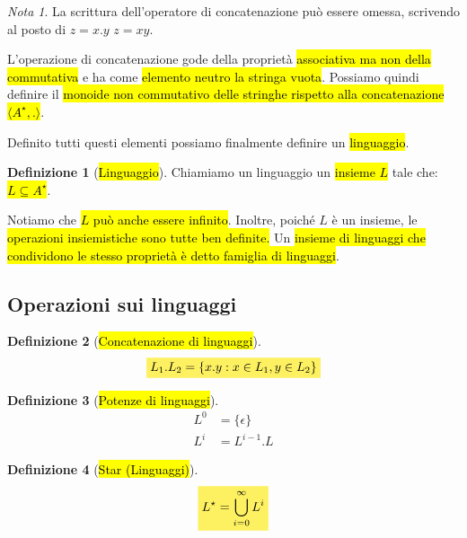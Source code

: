 \documentclass[a4paper,11pt,twoside]{article}
\theoremstyle{plain}
\theoremstyle{definition}
\newtheorem{defn}{Definizione}[section]
\theoremstyle{remark}
\newtheorem*{nota}{Nota}
\newcommand{\mhl}[1]{\colorbox{hlcolor}{$\displaystyle #1$}}
\begin{document}
\begin{nota}
  La scrittura dell'operatore di concatenazione può essere omessa, scrivendo al
  posto di $z = x.y$ $z = xy$.
\end{nota}

L'operazione di concatenazione gode della proprietà \hl{associativa ma non della
commutativa} e ha come \hl{elemento neutro la stringa vuota}. Possiamo quindi
definire il \hl{monoide non commutativo delle stringhe rispetto alla
concatenazione $\langle A^\star, . \rangle$}.

Definito tutti questi elementi possiamo finalmente definire un \hl{linguaggio}.

\begin{defn}[\hl{Linguaggio}]\label{def:linguaggio}
  Chiamiamo un linguaggio un \hl{insieme $L$} tale che:
  \hl{$L \subseteq A^\star$}.
\end{defn}

Notiamo che \hl{$L$ può anche essere infinito}. Inoltre, poiché $L$ è un
insieme, le \hl{operazioni insiemistiche sono tutte ben definite.} Un
\hl{insieme di linguaggi che condividono le stesso proprietà è detto famiglia di
linguaggi}.

\subsection{Operazioni sui linguaggi}

\begin{defn}[\hl{Concatenazione di linguaggi}]\label{def:concatenazione-ling}
  \begin{equation}
    \mhl{ L_1 . L_2 = \{ x.y : x \in L_1, y \in L_2 \} }
  \end{equation}
\end{defn}

\begin{defn}[\hl{Potenze di linguaggi}]\label{def:potenze-linguaggi}
  \begin{equation}
    \begin{aligned}
      L^0 & = \{\epsilon\} \\
      L^i & = L^{i-1}.L
    \end{aligned}
  \end{equation}
\end{defn}

\begin{defn}[\hl{Star (Linguaggi)}]\label{def:star-linguaggi}
  \begin{equation}
    \mhl{ L^\star = \bigcup^{\infty}_{i=0} L^i }
  \end{equation}
\end{defn}
\end{document}

